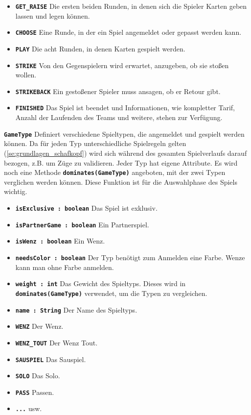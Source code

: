 \documentclass[
							a4paper, 
							11pt, 
							openany, 
							liststotoc,
							parskip=half, 
   							headings=normal
						]{scrreprt}
\begin{document}
{\begin{itemize}
	\item \textbf{\texttt{GET{\_}RAISE}} Die ersten beiden Runden, in denen sich die Spieler Karten geben lassen und legen können.
	\item \textbf{\texttt{CHOOSE}} Eine Runde, in der ein Spiel angemeldet oder gepasst werden kann.
	\item \textbf{\texttt{PLAY}} Die acht Runden, in denen Karten gespielt werden.
	\item \textbf{\texttt{STRIKE}} Von den Gegenspielern wird erwartet, anzugeben, ob sie stoßen wollen.
	\item \textbf{\texttt{STRIKEBACK}} Ein gestoßener Spieler muss ansagen, ob er Retour gibt.
	\item \textbf{\texttt{FINISHED}} Das Spiel ist beendet und Informationen, wie kompletter Tarif, Anzahl der Laufenden des Teams und weitere, stehen zur Verfügung.
\end{itemize}\bigskip

\textbf{\texttt{GameType}} Definiert verschiedene Spieltypen, die angemeldet und gespielt werden können. Da für jeden Typ unterschiedliche Spielregeln gelten (\autoref{se:grundlagen_schafkopf}) wird sich während des gesamten Spielverlaufs darauf bezogen, z.B. um Züge zu validieren. Jeder Typ hat eigene Attribute. Es wird noch eine Methode \textbf{\texttt{dominates(GameType)}} angeboten, mit der zwei Typen verglichen werden können. Diese Funktion ist für die Auswahlphase des Spiels wichtig.

\begin{itemize}
	\item \textbf{\texttt{isExclusive : boolean}} Das Spiel ist exklusiv.
	\item \textbf{\texttt{isPartnerGame : boolean}} Ein Partnerspiel.
	\item \textbf{\texttt{isWenz : boolean}} Ein Wenz.
	\item \textbf{\texttt{needsColor : boolean}} Der Typ benötigt zum Anmelden eine Farbe. Wenze kann man ohne Farbe anmelden.
	\item \textbf{\texttt{weight : int}} Das Gewicht des Spieltyps. Dieses wird in \textbf{\texttt{dominates(GameType)}} verwendet, um die Typen zu vergleichen.
	\item \textbf{\texttt{name : String}} Der Name des Spieltyps.
	\item \textbf{\texttt{WENZ}} Der Wenz.
	\item \textbf{\texttt{WENZ{\_}TOUT}} Der Wenz Tout.
	\item \textbf{\texttt{SAUSPIEL}} Das Sauspiel.
	\item \textbf{\texttt{SOLO}} Das Solo.
	\item \textbf{\texttt{PASS}} Passen.
	\item \textbf{\texttt{...}} usw.
\end{itemize}\bigskip

}
\end{document}
